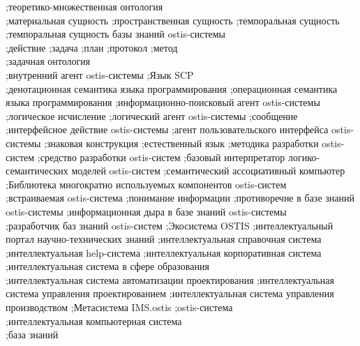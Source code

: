 {	
;теоретико-множественная онтология\\
;материальная сущность
;пространственная сущность
;темпоральная сущность\\
;темпоральная сущность базы знаний ostis-системы\\
;действие
;задача
;план
;протокол
;метод\\
;задачная онтология\\
;внутренний агент ostis-системы
;Язык SCP\\
;денотационная семантика языка программирования
;операционная семантика языка программирования
;информационно-поисковый агент ostis-системы
;логическое исчисление
;логический агент ostis-системы
;сообщение
;интерфейсное действие ostis-системы
;агент пользовательского интерфейса ostis-системы
;знаковая конструкция
;естественный язык
;методика разработки ostis-систем
;средство разработки ostis-систем
;базовый интерпретатор логико-семантических моделей ostis-систем
;семантический ассоциативный компьютер
;Библиотека многократно используемых компонентов ostis-систем\\
;встраиваемая ostis-система
;понимание информации
;противоречие в базе знаний ostis-системы
;информационная дыра в базе знаний ostis-системы\\
;разработчик баз знаний ostis-систем
;Экосистема OSTIS
;интеллектуальный портал научно-технических знаний
;интеллектуальная справочная система
;интеллектуальная help-система
;интеллектуальная корпоративная система
;интеллектуальная система в сфере образования\\
;интеллектуальная система автоматизации проектирования
;интеллектуальная система управления проектированием
;интеллектуальная система управления производством
;Метасистема IMS.ostis
;ostis-система\\
;интеллектуальная компьютерная система\\
;база знаний
}